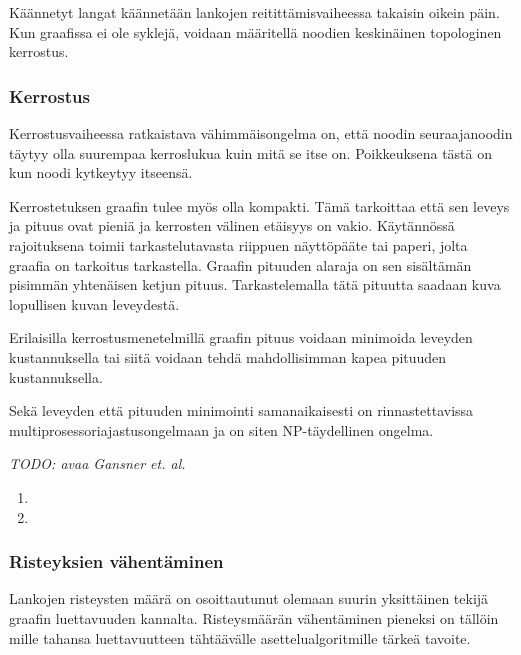 \documentclass[finnish,12pt]{article}
\begin{document}
Käännetyt langat käännetään lankojen reitittämisvaiheessa takaisin oikein päin.
Kun graafissa ei ole syklejä, voidaan määritellä noodien keskinäinen topologinen kerrostus.

		\subsubsection{Kerrostus}

Kerrostusvaiheessa ratkaistava vähimmäisongelma on, että noodin seuraajanoodin täytyy olla suurempaa kerroslukua kuin mitä se itse on.
Poikkeuksena tästä on kun noodi kytkeytyy itseensä.

Kerrostetuksen graafin tulee myös olla kompakti. Tämä tarkoittaa että sen leveys ja pituus ovat pieniä ja kerrosten välinen etäisyys on vakio. 
Käytännössä rajoituksena toimii tarkastelutavasta riippuen näyttöpääte tai paperi, jolta graafia on tarkoitus tarkastella.
Graafin pituuden alaraja on sen sisältämän pisimmän yhtenäisen ketjun pituus. Tarkastelemalla tätä pituutta saadaan kuva lopullisen kuvan leveydestä.

Erilaisilla kerrostusmenetelmillä graafin pituus voidaan minimoida leveyden kustannuksella tai siitä voidaan tehdä mahdollisimman kapea pituuden kustannuksella.

Sekä leveyden että pituuden minimointi samanaikaisesti on rinnastettavissa multiprosessoriajastusongelmaan ja on siten NP-täydellinen ongelma. \cite{RefWorks:39}

\emph{TODO: avaa Gansner et. al.}


\begin{enumerate}
	\item 
	\item 
\end{enumerate}


		\subsubsection{Risteyksien vähentäminen}


Lankojen risteysten määrä on osoittautunut olemaan suurin yksittäinen tekijä graafin luettavuuden kannalta. \cite{RefWorks:47}
Risteysmäärän vähentäminen pieneksi on tällöin mille tahansa luettavuutteen tähtäävälle asettelualgoritmille tärkeä tavoite.
\end{document}
